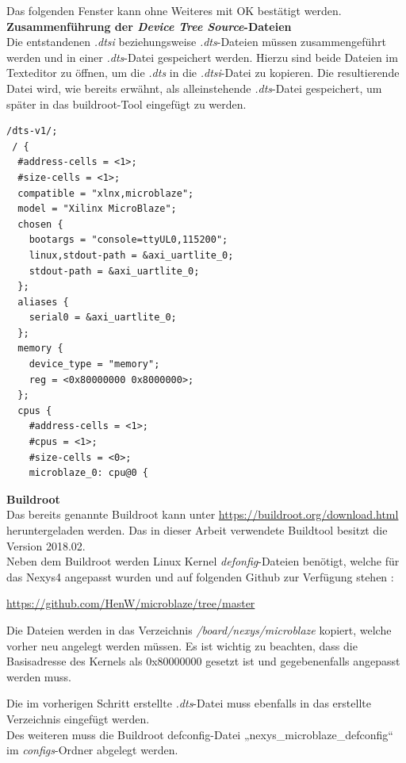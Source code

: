 Das folgenden Fenster kann ohne Weiteres mit OK bestätigt werden.\\


\textbf{Zusammenführung der \emph{Device Tree Source}-Dateien}\\

Die entstandenen \emph{.dtsi} beziehungsweise \emph{.dts}-Dateien müssen zusammengeführt werden und in einer \emph{.dts}-Datei gespeichert werden.
Hierzu sind beide Dateien im Texteditor zu öffnen, um die \emph{.dts}
 in die \emph{.dtsi}-Datei zu kopieren.
 Die resultierende Datei wird, wie bereits erwähnt, als alleinstehende \emph{.dts}-Datei gespeichert, um später in das buildroot-Tool eingefügt zu werden.\\

 \begin{lstlisting}[caption={Artix7.dts-Datei},label={code:artixdts}]
 /dts-v1/;
 / {
  #address-cells = <1>;
  #size-cells = <1>;
  compatible = "xlnx,microblaze";
  model = "Xilinx MicroBlaze";
  chosen {
    bootargs = "console=ttyUL0,115200";
    linux,stdout-path = &axi_uartlite_0;
    stdout-path = &axi_uartlite_0;
  };
  aliases {
    serial0 = &axi_uartlite_0;
  };
  memory {
    device_type = "memory";
    reg = <0x80000000 0x8000000>;
  };
  cpus {
    #address-cells = <1>;
    #cpus = <1>;
    #size-cells = <0>;
    microblaze_0: cpu@0 {
  \end{lstlisting}


\textbf{Buildroot}\\

Das bereits genannte Buildroot kann unter \url{https://buildroot.org/download.html} heruntergeladen werden.
Das in dieser Arbeit verwendete Buildtool besitzt die Version 2018.02.\\
Neben dem Buildroot werden Linux Kernel \emph{defonfig}-Dateien benötigt, welche für das Nexys4 angepasst wurden und auf folgenden Github zur Verfügung stehen :

\url{https://github.com/HenW/microblaze/tree/master}

Die Dateien werden in das Verzeichnis \emph{/board/nexys/microblaze} kopiert, welche vorher neu angelegt werden müssen.
 Es ist wichtig zu beachten, dass die Basisadresse des Kernels als 0x80000000 gesetzt ist und gegebenenfalls angepasst werden muss.

Die im vorherigen Schritt erstellte \emph{.dts}-Datei muss ebenfalls in das erstellte Verzeichnis eingefügt werden.\\

Des weiteren muss die Buildroot defconfig-Datei „nexys\_microblaze\_defconfig“ im \emph{configs}-Ordner abgelegt werden.\\

